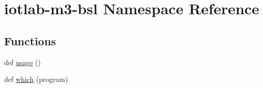 \hypertarget{namespaceiotlab-m3-bsl}{}\section{iotlab-\/m3-\/bsl Namespace Reference}
\label{namespaceiotlab-m3-bsl}
\subsection*{Functions}
\begin{DoxyCompactItemize}
\item 
def \hyperlink{namespaceiotlab-m3-bsl_ac40b90bc19b123467961b89c6af5c503}{usage} ()
\item 
def \hyperlink{namespaceiotlab-m3-bsl_ad8620aaf1b6b0e24a00128cd84915de4}{which} (program)
\end{DoxyCompactItemize}
